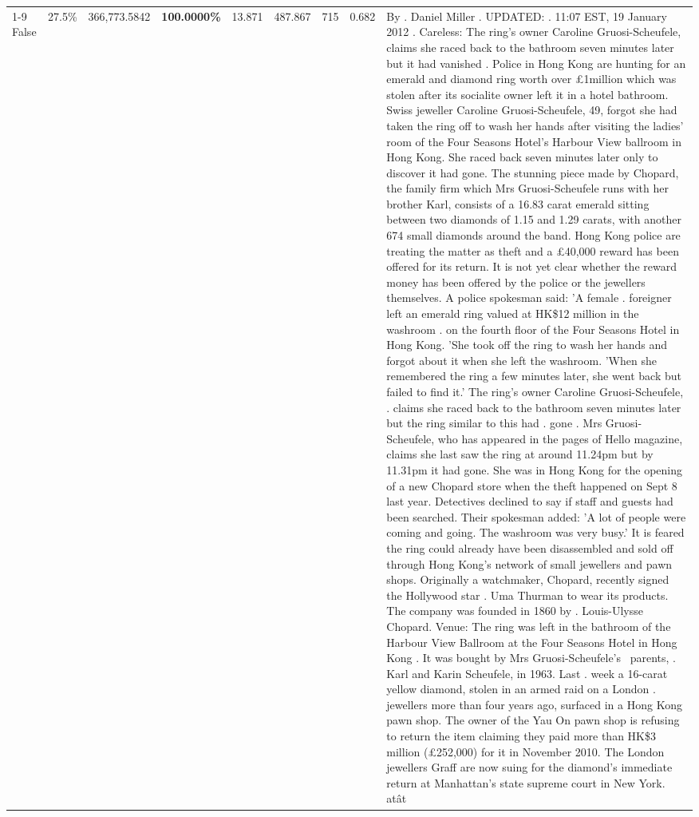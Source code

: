 \begin{table}[H]
\begin{tabular}{lllrlllll}
\cline{1-9}
False & 27.5\% & 366,773.5842 & \bfseries \color{red} 100.0000\% & 13.871 & 487.867 & 715 & 0.682 & By . Daniel Miller . UPDATED: . 11:07 EST, 19 January 2012 . Careless: The ring's owner Caroline Gruosi-Scheufele, claims she raced back to the bathroom seven minutes later but it had vanished . Police in Hong Kong are hunting for an emerald and diamond ring worth over £1million which was stolen after its socialite owner left it in a hotel bathroom. Swiss jeweller Caroline Gruosi-Scheufele, 49, forgot she had taken the ring off to wash her hands after visiting the ladies' room of the Four Seasons Hotel's Harbour View ballroom in Hong Kong. She raced back seven minutes later only to discover it had gone. The stunning piece made by Chopard, the family firm which Mrs Gruosi-Scheufele runs with her brother Karl, consists of a 16.83 carat emerald sitting between two diamonds of 1.15 and 1.29 carats, with another 674 small diamonds around the band. Hong Kong police are treating the matter as theft and a £40,000 reward has been offered for its return. It is not yet clear whether the reward money has been offered by the police or the jewellers themselves. A police spokesman said: 'A female . foreigner left an emerald ring valued at HK\$12 million in the washroom . on the fourth floor of the Four Seasons Hotel in Hong Kong. 'She took off the ring to wash her hands and forgot about it when she left the washroom. 'When she remembered the ring a few minutes later, she went back but failed to find it.' The ring's owner Caroline Gruosi-Scheufele, . claims she raced back to the bathroom seven minutes later but the ring similar to this had . gone . Mrs Gruosi-Scheufele, who has appeared in the pages of Hello magazine, claims she last saw the ring at around 11.24pm but by 11.31pm it had gone. She was in Hong Kong for the opening of a new Chopard store when the theft happened on Sept 8 last year. Detectives declined to say if staff and guests had been searched. Their spokesman added: 'A lot of people were coming and going. The washroom was very busy.' It is feared the ring could already have been disassembled and sold off through Hong Kong's network of small jewellers and pawn shops. Originally a watchmaker, Chopard, recently signed the Hollywood star . Uma Thurman to wear its products. The company was founded in 1860 by . Louis-Ulysse Chopard. Venue: The ring was left in the bathroom of the Harbour View Ballroom at the Four Seasons Hotel in Hong Kong . It was bought by Mrs Gruosi-Scheufele's  parents, . Karl and Karin Scheufele, in 1963. Last . week a 16-carat yellow diamond, stolen in an armed raid on a London . jewellers more than four years ago, surfaced in a Hong Kong pawn shop. The owner of the Yau On pawn shop is refusing to return the item claiming they paid more than HK\$3 million (£252,000) for it in November 2010. The London jewellers Graff are now suing for the diamond’s immediate return at Manhattan’s state supreme court in New York. atât \\

\end{tabular}
\end{table}

